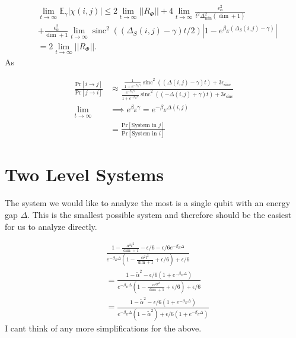 \documentclass{article}
\newcommand{\abs}[1]{\left| #1 \right|}
\newcommand{\norm}[1]{\left| \left| #1 \right| \right|}
\newcommand{\prob}[1]{\text{Pr}\left[ #1 \right]}
\DeclareMathOperator{\sinc}{sinc}
\begin{document}
\begin{align}
    &\lim_{t \to \infty} \mathbb{E}_{\gamma} \abs{\chi(i,j)} \leq 2 \lim_{t \to \infty} \norm{R_{\Phi}} + 4 \lim_{t \to \infty} \frac{\epsilon_{\alpha}^2}{t^2 \Delta_{\min}^2 (\dim + 1)} \nonumber \\
    &+ \frac{\epsilon_{\alpha}^2}{\dim + 1} \lim_{t \to \infty} \sinc^2((\Delta_S(i,j) - \gamma)t/2) \abs{1 - e^{\beta_E(\Delta_S(i,j) - \gamma)}} \\
    &= 2 \lim_{t \to \infty} \norm{R_{\Phi}}.
\end{align}
As 

\begin{align}
    \frac{\prob{i \to j}}{\prob{j \to i}} &\approx \frac{\frac{1}{1 + e^{-\beta_E \gamma}}\sinc^2 ((\Delta(i,j) - \gamma)t)+ 3 \epsilon_{\sinc}}{\frac{e^{-\beta_E \gamma}}{1 + e^{-\beta_E \gamma}} \sinc^2((-\Delta(i,j) + \gamma)t) + 3 \epsilon_{\sinc}}  \nonumber \\
    \lim_{t \to \infty} &\implies e^{\beta_E \gamma} = e^{-\beta_E \Delta(i,j)} \nonumber \\
    &= \frac{\prob{\text{System in } j}}{ \prob{\text{System in } i}} \nonumber
\end{align}

\section{Two Level Systems}
The system we would like to analyze the most is a single qubit with an energy gap $\Delta$. This is the smallest possible system and therefore should be the easiest for us to analyze directly. 

\begin{align}
    &\frac{1 - \frac{\alpha^2 t^2}{\dim + 1} - \epsilon/ 6 - \epsilon/6 e^{-\beta_E \Delta}}{e^{-\beta_E \Delta}(1 - \frac{\alpha^2 t^2}{\dim + 1} + \epsilon/6) + \epsilon / 6}  \\
    &= \frac{1 - \widetilde{\alpha}^2 - \epsilon/ 6(1  + e^{-\beta_E \Delta})}{e^{-\beta_E \Delta}(1 - \frac{\alpha^2 t^2}{\dim + 1} + \epsilon/6) + \epsilon / 6} 
    \\
    &= \frac{1 - \widetilde{\alpha}^2 - \epsilon/ 6(1  + e^{-\beta_E \Delta})}{e^{-\beta_E \Delta}(1 - \widetilde{\alpha}^2) + \epsilon / 6 (1 + e^{-\beta_E \Delta})} 
\end{align}
I cant think of any more simplifications for the above.
\end{document}
